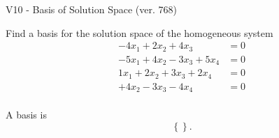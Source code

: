 \begin{exercise}
  \begin{exerciseTitle}V10 - Basis of Solution Space (ver. 768)\end{exerciseTitle}
  \begin{exerciseStatement}
    Find a basis for the solution space of the homogeneous system 
\begin{align*}
 -4 x_ 1 + 2 x_ 2 + 4 x_ 3 &= 0  \\ 
  -5 x_ 1 + 4 x_ 2 -3 x_ 3 + 5 x_ 4 &= 0  \\ 
  1 x_ 1 + 2 x_ 2 + 3 x_ 3 + 2 x_ 4 &= 0  \\ 
  + 4 x_ 2 -3 x_ 3 -4 x_ 4 &= 0  \\ 
 \end{align*}


 
  \end{exerciseStatement}

  \begin{exerciseAnswer}
   A basis is   
\[\left\{\right\}.\]

  


  \end{exerciseAnswer}
\end{exercise}